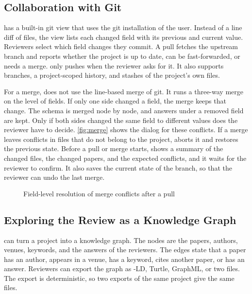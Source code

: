 \subsection{Collaboration with Git}\label{sec:tool-git}

\SaiLoR has a built-in git view that uses the git installation of the user.
Instead of a line diff of \JSON files, the view lists each changed field with its previous and current value.
Reviewers select which field changes they commit.
A pull fetches the upstream branch and reports whether the project is up to date, can be fast-forwarded, or needs a merge.
\SaiLoR only pushes when the reviewer asks for it.
It also supports branches, a project-scoped history, and stashes of the project's own files.

For a merge, \SaiLoR does not use the line-based merge of git.
It runs a three-way merge on the level of fields.
If only one side changed a field, the merge keeps that change.
The schema is merged node by node, and answers under a removed field are kept.
Only if both sides changed the same field to different values does the reviewer have to decide.
\autoref{fig:merge} shows the dialog for these conflicts.
If a merge leaves conflicts in files that do not belong to the project, \SaiLoR aborts it and restores the previous state.
Before a pull or merge starts, \SaiLoR shows a summary of the changed files, the changed papers, and the expected conflicts, and it waits for the reviewer to confirm.
It also saves the current state of the branch, so that the reviewer can undo the last merge.

\begin{figure}[t]
    \centering
    \screenshot{\shotMerge}{\columnwidth}
    \caption{Field-level resolution of merge conflicts after a pull}
    \label{fig:merge}
\end{figure}

\subsection{Exploring the Review as a Knowledge Graph}\label{sec:tool-graph}

\SaiLoR can turn a project into a knowledge graph.
The nodes are the papers, authors, venues, keywords, and the answers of the reviewers.
The edges state that a paper has an author, appears in a venue, has a keyword, cites another paper, or has an answer.
Reviewers can export the graph as \JSON-LD, \RDF Turtle, GraphML, or two \CSV files.
The export is deterministic, so two exports of the same project give the same files.

